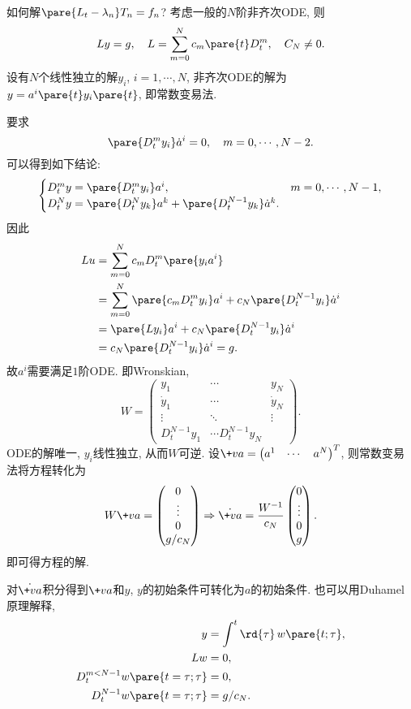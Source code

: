 \documentclass[hidelinks]{ctexart}
\begin{document}
如何解$\pare{L_t - \lambda_n}T_n = f_n$? 考虑一般的$N$阶非齐次ODE, 则
\[ Ly = g,\quad L = \sum_{m=0}^N c_m\pare{t}D_t^m,\quad C_N \neq 0. \]
设有$N$个线性独立的解$y_i$, $i=1,\cdots,N$, 非齐次ODE的解为$y = a^i\pare{t}y_i\pare{t}$, 即常数变易法.
\par
要求
\[ \pare{D_t^m y_i}\dot{a}^i = 0,\quad m = 0,\cdots, N-2. \]
可以得到如下结论:
\[ \begin{cases}
    D_t^m y = \pare{D_t^m y_i} a^i, & m = 0,\cdots,N-1,\\
    D_t^N y = \pare{D_t^N y_k}a^k + \pare{D_t^{N-1}y_k}\dot{a}^k.
\end{cases} \]
因此
\begin{align*}
    Lu &= \sum_{m=0}^N c_m D_t^m \pare{y_i a^i} \\
    &= \sum_{m=0}^N \pare{c_m D_t^m y_i} a^i + c_N\pare{D_t^{N-1}y_i}\dot{a}^i \\
    &= \pare{Ly_i}a^i + c_N\pare{D_t^{N-1}y_i}\dot{a}^i \\
    &= c_N\pare{D_t^{N-1}y_i}\dot{a}^i = g.
\end{align*}
故$a^i$需要满足$1$阶ODE.
 即Wronskian,
\[ W = \begin{pmatrix}
    y_1 & \cdots & y_N \\
    \dot{y}_1 & \cdots & \dot{y}_N \\
    \vdots & \ddots & \vdots \\
    D_t^{N-1}y_1 & \cdots D_t^{N-1}y_N
\end{pmatrix}. \]
ODE的解唯一, $y_i$线性独立, 从而$W$可逆. 设$\+va = \begin{pmatrix}
    a^1 & \cdots & a^N
\end{pmatrix}^T$, 则常数变易法将方程转化为
\[ W\+va = \begin{pmatrix}
    0 \\ \vdots \\ 0 \\ g/c_N
\end{pmatrix} \Rightarrow \dot{\+va} = \frac{W^{-1}}{c_N} \begin{pmatrix}
    0 \\ \vdots \\ 0 \\ g
\end{pmatrix}. \]
即可得方程的解.
\par
对$\dot{\+va}$积分得到$\+va$和$y$, $y$的初始条件可转化为$a$的初始条件. 也可以用Duhamel原理解释,
\begin{align*}
    y &= \int^t\rd{\tau}\,w\pare{t;\tau}, \\
    Lw &= 0, \\
    D_t^{m<N-1} w\pare{t=\tau;\tau} &= 0, \\
    D_t^{N-1}w\pare{t=\tau;\tau} &= g/c_N.
\end{align*}
\end{document}
